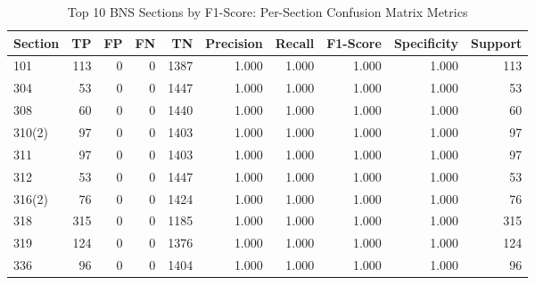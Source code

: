 \begin{table}
\caption{Top 10 BNS Sections by F1-Score: Per-Section Confusion Matrix Metrics}
\label{tab:per_section_cm}
\begin{tabular}{l|rrrr|rrrr|r}
\toprule
Section & TP & FP & FN & TN & Precision & Recall & F1-Score & Specificity & Support \\
\midrule
101 & 113 & 0 & 0 & 1387 & 1.000 & 1.000 & 1.000 & 1.000 & 113 \\
304 & 53 & 0 & 0 & 1447 & 1.000 & 1.000 & 1.000 & 1.000 & 53 \\
308 & 60 & 0 & 0 & 1440 & 1.000 & 1.000 & 1.000 & 1.000 & 60 \\
310(2) & 97 & 0 & 0 & 1403 & 1.000 & 1.000 & 1.000 & 1.000 & 97 \\
311 & 97 & 0 & 0 & 1403 & 1.000 & 1.000 & 1.000 & 1.000 & 97 \\
312 & 53 & 0 & 0 & 1447 & 1.000 & 1.000 & 1.000 & 1.000 & 53 \\
316(2) & 76 & 0 & 0 & 1424 & 1.000 & 1.000 & 1.000 & 1.000 & 76 \\
318 & 315 & 0 & 0 & 1185 & 1.000 & 1.000 & 1.000 & 1.000 & 315 \\
319 & 124 & 0 & 0 & 1376 & 1.000 & 1.000 & 1.000 & 1.000 & 124 \\
336 & 96 & 0 & 0 & 1404 & 1.000 & 1.000 & 1.000 & 1.000 & 96 \\
\bottomrule
\end{tabular}
\end{table}
